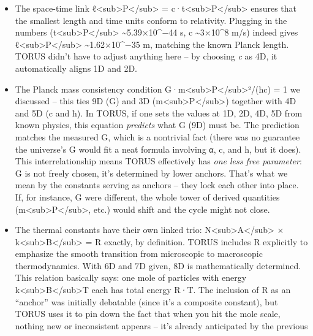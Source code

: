 \begin{itemize}
\item
  The space-time link
  ℓ\textless{}sub\textgreater{}P\textless{}/sub\textgreater{} =
  c·t\textless{}sub\textgreater{}P\textless{}/sub\textgreater{}​ ensures
  that the smallest length and time units conform to relativity.
  Plugging in the numbers
  (t\textless{}sub\textgreater{}P\textless{}/sub\textgreater{}
  \textasciitilde{}5.39×10\^{}−44 s, c \textasciitilde{}3×10\^{}8 m/s)
  indeed gives
  ℓ\textless{}sub\textgreater{}P\textless{}/sub\textgreater{}
  \textasciitilde{}1.62×10\^{}−35 m, matching the known Planck length.
  TORUS didn't have to adjust anything here -- by choosing \emph{c} as
  4D, it automatically aligns 1D and 2D.
\item
  The Planck mass consistency condition
  G·m\textless{}sub\textgreater{}P\textless{}/sub\textgreater{}²/(ħc) =
  1​ we discussed -- this ties 9D (G) and 3D
  (m\textless{}sub\textgreater{}P\textless{}/sub\textgreater{}) together
  with 4D and 5D (c and ħ). In TORUS, if one sets the values at 1D, 2D,
  4D, 5D from known physics, this equation \emph{predicts} what G (9D)
  must be. The prediction matches the measured G, which is a nontrivial
  fact (there was no guarantee the universe's G would fit a neat formula
  involving α, c, and h, but it does). This interrelationship means
  TORUS effectively has \emph{one less free parameter}: G is not freely
  chosen, it's determined by lower anchors​. That's what we mean by the
  constants serving as anchors -- they lock each other into place. If,
  for instance, G were different, the whole tower of derived quantities
  (m\textless{}sub\textgreater{}P\textless{}/sub\textgreater{}, etc.)
  would shift and the cycle might not close.
\item
  The thermal constants have their own linked trio:
  N\textless{}sub\textgreater{}A\textless{}/sub\textgreater{} ×
  k\textless{}sub\textgreater{}B\textless{}/sub\textgreater{} = R
  exactly, by definition. TORUS includes R explicitly to emphasize the
  smooth transition from microscopic to macroscopic thermodynamics​.
  With 6D and 7D given, 8D is mathematically determined. This relation
  basically says: one mole of particles with energy
  k\textless{}sub\textgreater{}B\textless{}/sub\textgreater{}T each has
  total energy R·T. The inclusion of R as an ``anchor'' was initially
  debatable (since it's a composite constant), but TORUS uses it to pin
  down the fact that when you hit the mole scale, nothing new or
  inconsistent appears -- it's already anticipated by the previous

\end{itemize}
